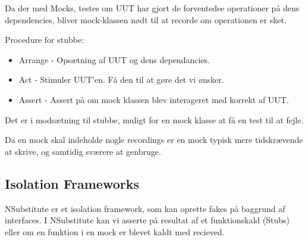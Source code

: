 Da der med Mocks, testes om UUT har gjort de forventedee operationer på dens dependencies, bliver mock-klassen nødt til at recorde om operationen er sket.

Procedure for stubbe:
\begin{itemize}
	\item Arrange - Opsætning af UUT og dens dependancies.
	\item Act - Stimuler UUT'en. Få den til at gøre det vi ønsker.
	\item Assert - Assert på om mock klassen blev interageret med korrekt af UUT.
\end{itemize}

Det er i modsætning til stubbe, muligt for en mock klasse at få en test til at fejle.

Da en mock skal indeholde nogle recordings er en mock typisk mere tidskrævende at skrive, og samtidig sværere at genbruge.


\subsection{Isolation Frameworks}

NSubstitute er et isolation framework, som kan oprette fakes på baggrund af interfaces. I NSubstitute kan vi asserte på resultat af et funktionskald (Stubs) eller om en funktion i en mock er blevet kaldt med recieved.